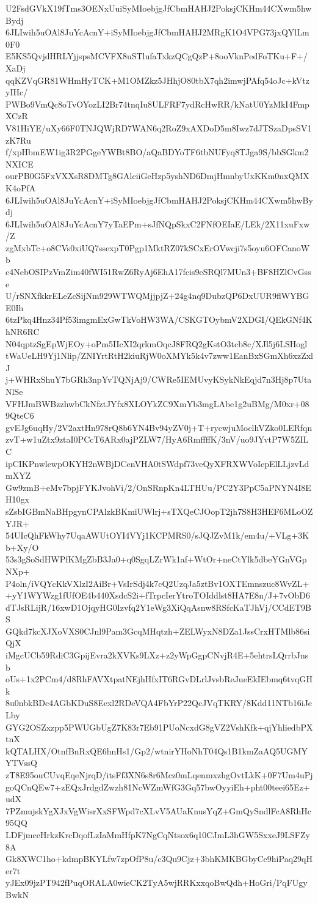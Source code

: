 U2FsdGVkX19fTms3OENxUuiSyMIoebjgJfCbmHAHJ2PoksjCKHm44CXwm5hwBydj
6JLIwih5uOAl8JuYcAcnY+iSyMIoebjgJfCbmHAHJ2MRgK1O4VPG73jxQYlLm0F0
E5KS5QvjdHRLYjjspsMCVFX8uSTlufaTxkzQCgQzP+8ooVknPedFoTKu+F+/XaDj
qqKZVqGR81WHmHyTCK+M1OMZkz5JHhjO80tbX7qh2imwjPAfq54oJc+kVtzyIHc/
PWBo9VmQc8oTvOYozLI2Br74tnqIu8ULFRF7ydRcHwRR/kNatU0YzMkI4FmpXCzR
V81HiYE/uXy66F0TNJQWjRD7WAN6q2RoZ9xAXDoD5m8Iwz7dJTSzaDpsSV1zK7Ru
f/xpHbmEW1ig3R2PGgeYWBt8BO/aQaBDYoTF6tbNUFyq8TJga9S/bbSGkm2NXICE
ourPB0G5FxVXXsR8DMTg8GAlciiGeHzp5yshND6DmjHmnbyUxKKm0nxQMXK4oPfA
6JLIwih5uOAl8JuYcAcnY+iSyMIoebjgJfCbmHAHJ2PoksjCKHm44CXwm5hwBydj
6JLIwih5uOAl8JuYcAcnY7yTaEPm+sJfNQpSkxC2FNfOEIaE/LEk/2X11xuFxw/Z
zgMxbTc+o8CVs0xiUQ7ssexpT0Pgp1MktRZ07kSCxErOVwcji7s5oyu6OFCanoWb
c4NebOSIPzVmZim40fWI51RwZ6RyAj6EhA17fcis9eSRQl7MUn3+BF8HZlCvGsse
U/rSNXfkkrELeZcSijNm929WTWQMjjpjZ+24g4nq9DubzQP6DxUUR9flWYBGE0Ih
6tzPkq4Hnz34Pf53imgmExGwTkVoHW3WA/CSKGTOybmV2XDGI/QEkGNf4KhNR6RC
N04qptzSgEpWjEOy+oPm5IIcXI2qrkmOqcJ8FRQ2gKstO3tcb8c/XJl5j6LSHogl
tWaUeLH9Yj1Nlip/ZNIYrtRtH2kiuRjW0oXMYk5k4v7zww1EanBxSGmXh6xzZxlJ
j+WHRxShuY7bGRh3npYvTQNjAj9/CWRe5IEMUvyKSykNkEqjd7n3Hj8p7UtaNlSe
VFHJmBWBzzhwbCkNfztJYfx8XLOYkZC9XmYb3mgLAbe1g2uBMg/M0xr+089QteC6
gvEJg6uqHy/2V2axtHn978rQ8b6YN4Bv94yZV0j+T+rycwjuMoclhVZko0LERfqn
zvT+w1uZtx9ztaI0PCcT6ARx0ajPZLW7/HyA6RmffffK/3nV/uo9JYvtP7W5ZILC
ipCIKPnwlewpOKYH2nWBjDCenVHA0tSWdpf73veQyXFRXWVoIcpElLLjzvLdmXYZ
Gw9zmB+eMv7bpjFYKJvohVi/2/OnSRnpKn4LTHUu/PC2Y3PpC5aPNYN4I8EH10gx
sZsbIGBmNaBHpgynCPAlzkBKmiUWlrj+sTXQeCJOopT2jh7S8H3HEF6MLoOZYJR+
54UIcQhFkWhy7UqaAWUtOYI4VYj1KCPMRS0/sJQJZvM1k/em4u/+VLg+3Kb+Xy/O
53s3gSoSdHWPfKMgZbB3Ja0+q0SgqLZrWk1af+WtOr+neCtYlk5dbeYGnVGpNXp+
P4oln/iVQYcKkVXlzI2AiBr+VsIrSdj4k7cQ2UzqJa5ztBv1OXTEmnszuc8WvZL+
+yY1WYWzg1fUfOE4b440XsdcS2i+fTrpcIerYtroTOIddlst8HA7E8n/J+7vObD6
dTJsRLijR/16xwD1OjqyHG0Izvfq2Y1eWg3XiQqAsnw8RSfcKaTJhVj/CCdET9BS
GQkd7kcXJXoVXS0CJnl9Pam3GcqMHqtzh+ZELWyxN8DZa1JssCrxHTMlb86siQjX
iMgcUCb59RdiC3GpijEvra2kXVKs9LXz+z2yWpGgpCNvjR4E+5ehtrsLQrrbJnsb
oUs+1x2PCm4/d8RhFAVXtpatNEjhHfxIT6RGvDLrlJvsbReJueEkIEbmq6tvqGHk
8u0nbkBDc4AGbKDuS8Eexl2RDeVQA4FbYrP22QcJVqTKRY/8Kdd11NTb16iJeLby
GYG2OSZxzpp5PWUGbUgZ7K83r7Eb91PUoNcxdG8gVZ2VshKfk+qjYhliedbPXtnX
kQTALHX/OtnfBnRxQE6hnHs1/Gp2/wtnirYHoNhT04Qs1B1kmZaAQ5UGMYYTVssQ
zT8E95ouCUvqEqeNjrqD/itsFf3XN6s8r6Mcz0mLqenmxzhgOvtLkK+0F7Um4uPj
goQCnQEw7+zEQxJrdgdZwzh81NcWZmWfG3Gq57bwOyyiEh+pht00teei65Ez+udX
7PZmujskYgXJxVgWisrXxSFWpd7cXLvV5AUaKnusYqZ+GmQySndlFcA8RhHc95QQ
LDFjmceHrkzKrcDqofLzIaMmHfpK7NgCqNtsox6q10CJmL3hGW5SxxeJ9LSFZy8A
Gk8XWC1ho+kdmpBKYLfw7zpOfP8u/c3Qu9Cjz+3bhKMKBGbyCe9hiPaq29qHer7t
yJEx09jzPT942fPuqORALA0wieCK2TyA5wjRRKxxqoBwQdh+HoGri/PqFUgyBwkN
